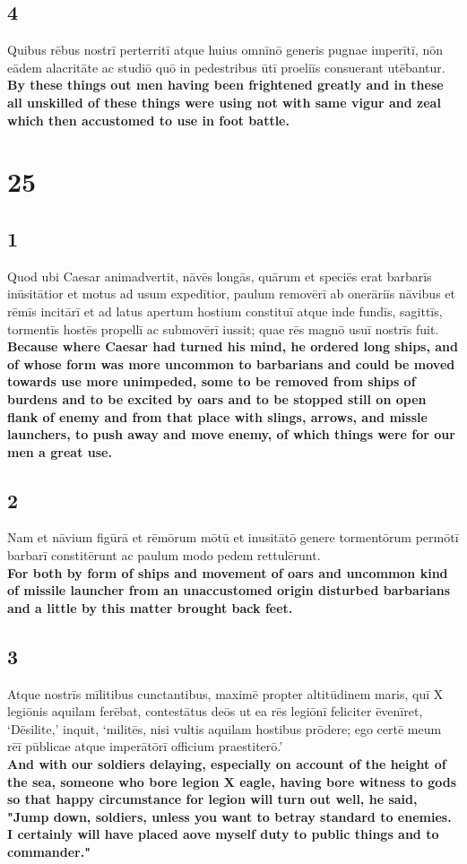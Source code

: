 \documentclass{article}
\begin{document}
\subsection*{4}
Quibus rēbus nostrī perterritī atque huius omnīnō generis pugnae imperītī, nōn eādem alacritāte ac studiō quō in pedestribus ūtī proeliīs consuerant utēbantur. \\
\textbf{By these things out men having been frightened greatly and in these all unskilled of these things were using not with same vigur and zeal which then accustomed to use in foot battle. }


\section*{25}
\subsection*{1}
Quod ubi Caesar animadvertit, nāvēs longās, quārum et speciēs erat barbarīs inūsitātior et motus ad usum expedītior, paulum removērī ab onerāriīs nāvibus et rēmīs incitārī et ad latus apertum hostium constituī atque inde fundīs, sagittīs, tormentīs hostēs propellī ac submovērī iussit; quae rēs magnō usuī nostrīs fuit. \\
\textbf{Because where Caesar had turned his mind, he ordered long ships, and of whose form was more uncommon to barbarians and could be moved towards use more unimpeded, some to be removed from ships of burdens and to be excited by oars and to be stopped still on open flank of enemy and from that place with slings, arrows, and missle launchers, to push away and move enemy, of which things were for our men a great use.}

\subsection*{2}
Nam et nāvium figūrā et rēmōrum mōtū et inusitātō genere tormentōrum permōtī barbarī constitērunt ac paulum modo pedem rettulērunt.\\
\textbf{For both by form of ships and movement of oars and uncommon kind of missile launcher from an unaccustomed origin disturbed barbarians and a little by this matter brought back feet.}

\subsection*{3}
Atque nostrīs mīlitibus cunctantibus, maximē propter altitūdinem maris, quī X legiōnis aquilam ferēbat, contestātus deōs ut ea rēs legiōnī feliciter ēvenīret, ‘Dēsilite,’ inquit, ‘militēs, nisi vultis aquilam hostibus prōdere; ego certē meum rēī pūblicae atque imperātōrī officium praestiterō.’\\
\textbf{And with our soldiers delaying, especially on account of the height of the sea, someone who bore legion X eagle, having bore witness to gods so that happy circumstance for legion will turn out well, he said, "Jump down, soldiers, unless you want to betray standard to enemies. I certainly will have placed aove myself duty to public things and to commander." }
\end{document}
